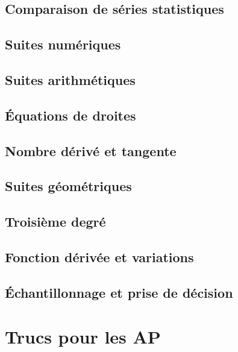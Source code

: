 \documentclass[a4paper,12pt]{book}
\begin{document}
\chapter{Comparaison de séries statistiques}


\chapter{Suites numériques}


\chapter{Suites arithmétiques}


\chapter{Équations de droites}


\chapter{Nombre dérivé et tangente}


\chapter{Suites géométriques}


\chapter{Troisième degré}


\chapter{Fonction dérivée et variations}


\chapter{Échantillonnage et prise de décision}


\part{Trucs pour les AP}

\end{document}

